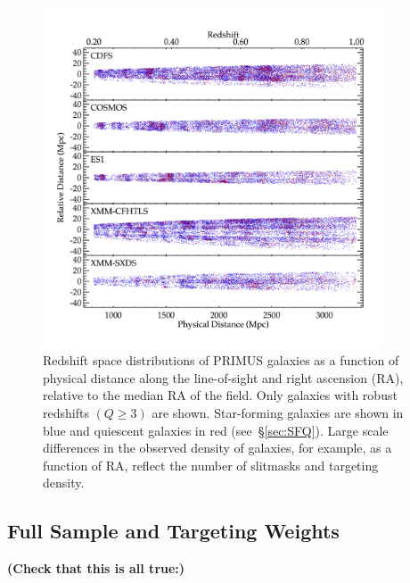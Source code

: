 \begin{figure}
  \centering
  \includegraphics[width=0.9\textwidth,natwidth=600,trim={0.2in 0.5in 0.4in 0.6in},clip]{figures/cone_diagrams.png}
  \caption{Redshift space distributions of PRIMUS galaxies as a function of physical distance along the line-of-sight and right ascension (RA), relative to the median RA of the field.
Only galaxies with robust redshifts ${(Q \ge 3)}$ are shown.
Star-forming galaxies are shown in blue and quiescent galaxies in red (see~\S\ref{sec:SFQ}). Large scale differences in the observed density of galaxies, for example, as a function of RA, reflect the number of slitmasks and targeting density.
}
  \label{fig:cone_diagrams}
\end{figure}

\subsection{Full Sample and Targeting Weights}\label{sec:targ_weight}
 
{\bf(Check that this is all true:)}

